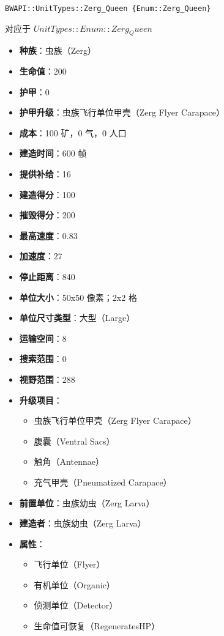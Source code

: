 \begin{tcolorbox}[colback=white, colframe=black!60!white, title=Zerg\_Queen(), arc=0mm]
    \begin{verbatim}
BWAPI::UnitTypes::Zerg_Queen {Enum::Zerg_Queen}
    \end{verbatim}
    对应于  $ UnitTypes::Enum::Zerg_Queen $ 
    \begin{itemize}
        \item \textbf{种族}：虫族（Zerg）
        \item \textbf{生命值}：200
        \item \textbf{护甲}：0
        \item \textbf{护甲升级}：虫族飞行单位甲壳（Zerg Flyer Carapace）
        \item \textbf{成本}：100 矿，0 气，0 人口
        \item \textbf{建造时间}：600 帧
        \item \textbf{提供补给}：16
        \item \textbf{建造得分}：100
        \item \textbf{摧毁得分}：200
        \item \textbf{最高速度}：0.83
        \item \textbf{加速度}：27
        \item \textbf{停止距离}：840
        \item \textbf{单位大小}：50x50 像素；2x2 格
        \item \textbf{单位尺寸类型}：大型（Large）
        \item \textbf{运输空间}：8
        \item \textbf{搜索范围}：0
        \item \textbf{视野范围}：288
        \item \textbf{升级项目}：
            \begin{itemize}
                \item 虫族飞行单位甲壳（Zerg Flyer Carapace）
                \item 腹囊（Ventral Sacs）
                \item 触角（Antennae）
                \item 充气甲壳（Pneumatized Carapace）
            \end{itemize}
        \item \textbf{前置单位}：虫族幼虫（Zerg Larva）
        \item \textbf{建造者}：虫族幼虫（Zerg Larva）
        \item \textbf{属性}：
            \begin{itemize}
                \item 飞行单位（Flyer）
                \item 有机单位（Organic）
                \item 侦测单位（Detector）
                \item 生命值可恢复（RegeneratesHP）
            \end{itemize}
    \end{itemize}
\end{tcolorbox}

